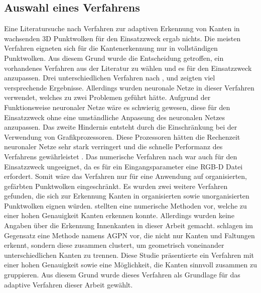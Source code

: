 \subsection{Auswahl eines Verfahrens}
Eine Literatursuche nach Verfahren zur adaptiven Erkennung von Kanten in wachsenden 3D Punktwolken für den Einsatzzweck ergab nichts. Die meisten Verfahren eigneten sich für die Kantenerkennung nur in vollständigen Punktwolken. Aus diesem Grund wurde die Entscheidung getroffen, ein vorhandenes Verfahren aus der Literatur zu wählen und es für den Einsatzzweck anzupassen. Drei unterschiedlichen Verfahren nach \textcite{bazazian_edc-net_2021}, \textcite{himeur_pcednet_2021} und \textcite{rachmadi_road_2017} zeigten viel versprechende Ergebnisse. Allerdings wurden neuronale Netze in dieser Verfahren verwendet, welches zu zwei Problemen geführt hätte. Aufgrund der Funktionsweise neuronaler Netze wäre es schwierig gewesen, diese für den Einsatzzweck ohne eine umständliche Anpassung des neuronalen Netzes anzupassen. Das zweite Hindernis entsteht durch die Einschränkung bei der Verwendung von Grafikprozessoren. Diese Prozessoren hätten die Rechenzeit neuronaler Netze sehr stark verringert und die schnelle Performanz des Verfahrens gewährleistet \autocite[625]{luo_artificial_2005}. Das numerische Verfahren nach \textcite{choi_rgb-d_2013} war auch für den Einsatzzweck ungeeignet, da es für ein Eingangsparameter eine RGB-D Datei erfordert. Somit wäre das Verfahren nur für eine Anwendung auf organisierten, gefärbten Punktwolken eingeschränkt. Es wurden zwei weitere Verfahren gefunden, die sich zur Erkennung Kanten in organisierten sowie unorganisierten Punktwolken eignen würden. \textcite{mineo_novel_2019} stellten eine numerische Methoden vor, welche zu einer hohen Genauigkeit Kanten erkennen konnte. Allerdings wurden keine Angaben über die Erkennung Innenkanten in dieser Arbeit gemacht. \textcite{ni_edge_2016} schlagen im Gegensatz eine Methode namens AGPN vor, die nicht nur Kanten und Faltungen erkennt, sondern diese zusammen clustert, um geometrisch  voneinander unterschiedlichen Kanten zu trennen. Diese Studie präsentierte ein Verfahren mit einer hohen Genauigkeit sowie eine Möglichkeit, die Kanten sinnvoll zusammen zu gruppieren. Aus diesem Grund wurde dieses Verfahren als Grundlage für das adaptive Verfahren dieser Arbeit gewählt.

